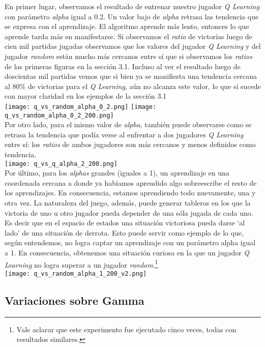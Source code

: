 \documentclass[10pt,a4paper]{article}
\begin{document}
En primer lugar, observamos el resultado de entrenar nuestro jugador \textit{Q Learning} con parámetro \textit{alpha} igual a 0.2. Un valor bajo de \textit{alpha} retrasa las tendencia que se expresa con el aprendizaje. El algoritmo aprende más lento, entonces lo que aprende tarda más en manifestarse. Si observamos el \textit{ratio} de victorias luego de cien mil partidas jugadas observamos que los valores del jugador \textit{Q Learning} y del jugador \textit{random} están mucho más cercanos entre sí que si observamos los \textit{ratios} de las primeras figuras en la sección 3.1. Incluso al ver el resultado luego de doscientas mil partidas vemos que si bien ya se manifiesta una tendencia cercana al 80\% de victorias para el \textit{Q Learning}, aún no alcanza este valor, lo que sí sucede con mayor claridad en los ejemplos de la sección 3.1
\\
\texttt{[image: q\_vs\_random\_alpha\_0\_2.png]}
\texttt{[image: q\_vs\_random\_alpha\_0\_2\_200.png]}
\\
Por otro lado, para el mismo valor de \textit{alpha}, también puede observarse como se retrasa la tendencia que podía verse al enfrentar a dos jugadores \textit{Q Learning} entre sí: los \textit{ratios} de ambos jugadores son más cercanos y menos definidos como tendencia.
\\
\texttt{[image: q\_vs\_q\_alpha\_2\_200.png]}
\\
Por último, para los \textit{alphas} grandes (iguales a 1), un aprendizaje en una coordenada cercana a donde ya habíamos aprendido algo sobreescribe el resto de los aprendizajes. En consecuencia, estamos aprendiendo todo nuevamente, una y otra vez. La naturaleza del juego, además, puede generar tableros en los que la victoria de uno u otro jugador pueda depender de una sóla jugada de cada uno. Es decir que en el espacio de estados una situación victoriosa pueda darse `al lado' de una situación de derrota. Esto puede servir como ejemplo de lo que, según entendemos, no logra captar un aprendizaje con un parámetro alpha igual a 1. En consecuencia, obtenemos una situación curiosa en la que un jugador \textit{Q Learning} no logra superar a un jugador \textit{random}.\footnote{Vale aclarar que este experimento fue ejecutado cinco veces, todas con resultados similares.}
\\
\texttt{[image: q\_vs\_random\_alpha\_1\_200\_v2.png]}
\\

\subsection{Variaciones sobre Gamma}
\end{document}
